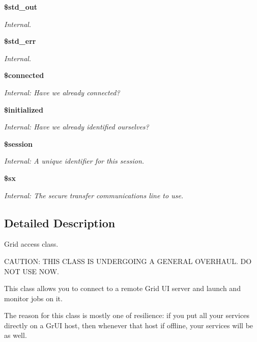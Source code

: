 \begin{CompactItemize}
{\bf \$std\_\-out}
\begin{CompactList}\small\item\em Internal. \item\end{CompactList}\item 
{\bf \$std\_\-err}
\begin{CompactList}\small\item\em Internal. \item\end{CompactList}\item 
{\bf \$connected}
\begin{CompactList}\small\item\em Internal: Have we already connected? \item\end{CompactList}\item 
{\bf \$initialized}
\begin{CompactList}\small\item\em Internal: Have we already identified ourselves? \item\end{CompactList}\item 
{\bf \$session}
\begin{CompactList}\small\item\em Internal: A unique identifier for this session. \item\end{CompactList}\item 
{\bf \$sx}
\begin{CompactList}\small\item\em Internal: The secure transfer communications line to use. \item\end{CompactList}\end{CompactItemize}


\subsection{Detailed Description}
Grid access class. 

CAUTION: THIS CLASS IS UNDERGOING A GENERAL OVERHAUL. DO NOT USE NOW.

This class allows you to connect to a remote Grid UI server and launch and monitor jobs on it.

The reason for this class is mostly one of resilience: if you put all your services directly on a Gr\-UI host, then whenever that host if offline, your services will be as well.

